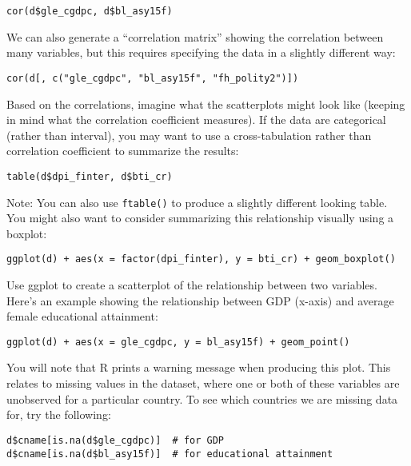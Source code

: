 \documentclass[a4paper,12pt]{article}
\begin{document}
\begin{enumerate*}
\begin{verbatim}
cor(d$gle_cgdpc, d$bl_asy15f)
\end{verbatim}

\noindent We can also generate a ``correlation matrix'' showing the correlation between many variables, but this requires specifying the data in a slightly different way:

\begin{verbatim}
cor(d[, c("gle_cgdpc", "bl_asy15f", "fh_polity2")])
\end{verbatim}

\item Based on the correlations, imagine what the scatterplots might look like (keeping in mind what the correlation coefficient measures). If the data are categorical (rather than interval), you may want to use a cross-tabulation rather than correlation coefficient to summarize the results:

\begin{verbatim}
table(d$dpi_finter, d$bti_cr)
\end{verbatim}

\noindent Note: You can also use \texttt{ftable()} to produce a slightly different looking table. You might also want to consider summarizing this relationship visually using a boxplot:

\begin{verbatim}
ggplot(d) + aes(x = factor(dpi_finter), y = bti_cr) + geom_boxplot()
\end{verbatim}

\item Use ggplot to create a scatterplot of the relationship between two variables. Here's an example showing the relationship between GDP (x-axis) and average female educational attainment:

\begin{verbatim}
ggplot(d) + aes(x = gle_cgdpc, y = bl_asy15f) + geom_point()
\end{verbatim}

\item You will note that R prints a warning message when producing this plot. This relates to missing values in the dataset, where one or both of these variables are unobserved for a particular country. To see which countries we are missing data for, try the following:

\begin{verbatim}
d$cname[is.na(d$gle_cgdpc)]  # for GDP
d$cname[is.na(d$bl_asy15f)]  # for educational attainment
\end{verbatim}


\end{enumerate*}
\end{document}
